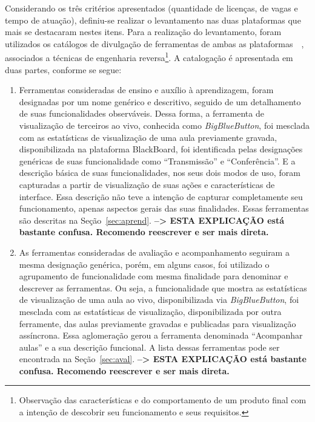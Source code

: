 Considerando os três critérios apresentados (quantidade de licenças, de vagas e tempo de atuação), definiu-se realizar o levantamento nas duas plataformas que mais se destacaram nestes itens. Para a realização do levantamento, foram utilizados os catálogos de divulgação de ferramentas de ambas as plataformas~\cite{moodle}~\cite{bblearn}, associados a técnicas de engenharia reversa\footnote{Observação das características e do comportamento de um produto final com a intenção de descobrir seu funcionamento e seus requisitos.}. A catalogação é apresentada em duas partes, conforme se segue:
\begin{enumerate}
	\item Ferramentas consideradas de ensino e auxílio à aprendizagem, foram designadas por um nome genérico e descritivo, seguido de um detalhamento de suas funcionalidades observáveis. Dessa forma, a ferramenta de visualização de terceiros ao vivo,  conhecida como \emph{BigBlueButton}, foi mesclada com as estatísticas de visualização de uma aula previamente gravada, disponibilizada na plataforma BlackBoard, foi identificada pelas designações genéricas de suas funcionalidade como ``Transmissão'' e ``Conferência''. E a descrição básica de suas funcionalidades, nos seus dois modos de uso, foram capturadas a partir de visualização de suas ações e características de interface. Essa descrição não teve a intenção de capturar completamente seu funcionamento, apenas aspectos gerais das suas finalidades. Essas ferramentas são descritas na Seção~\ref{sec:aprend}. \textbf{--> ESTA EXPLICAÇÃO está bastante confusa. Recomendo reescrever e ser mais direta.}
	\item As ferramentas consideradas de avaliação e acompanhamento seguiram a mesma designação genérica, porém, em alguns casos, foi utilizado o agrupamento de funcionalidade com mesma finalidade para denominar e descrever as ferramentas. Ou seja, a funcionalidade que mostra as estatísticas de visualização de uma aula ao vivo, disponibilizada via \emph{BigBlueButton}, foi mesclada com as estatísticas de visualização, disponibilizada por outra ferramente, das aulas previamente gravadas e publicadas para visualização assíncrona. Essa aglomeração gerou a ferramenta denominada ``Acompanhar aulas'' e a sua descrição funcional. A lista dessas ferramentas pode ser encontrada na Seção~\ref{sec:aval}. \textbf{--> ESTA EXPLICAÇÃO está bastante confusa. Recomendo reescrever e ser mais direta.}
\end{enumerate}
